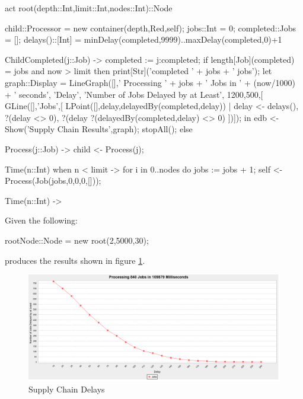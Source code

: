 \documentclass[5p,times]{elsarticle}
\begin{document}
\begin{ESL}
act root(depth::Int,limit::Int,nodes::Int)::Node {

  child::Processor = new container(depth,Red,self);
  jobs::Int = 0;
  completed::Jobs = [];
  delays()::[Int] = 
    minDelay(completed,9999)..maxDelay(completed,0)+1

  ChildCompleted(j::Job) -> {
    completed := j:completed;
    if length[Job](completed) = jobs and now > limit
    then {
      print[Str]('completed ' + jobs + ' jobs');
      let 
        graph::Display = 
          LineGraph([],'
                    Processing ' + jobs + ' Jobs in ' + 
                      (now/1000) + 
                      ' seconds',
                    'Delay',
                    'Number of Jobs Delayed by at Least',
                    1200,500,[
            GLine([],'Jobs',[
              LPoint([],delay,delayedBy(completed,delay)) | 
                delay <- delays(), 
                ?(delay <> 0), 
                ?(delay %
                ?(delayedBy(completed,delay) <> 0) ])]);
      in {
        edb <- Show('Supply Chain Results',graph);
        stopAll();
      }
    } else {}
  }

  Process(j::Job) -> child <- Process(j);

  Time(n::Int) when n < limit -> {
    for i in 0..nodes do {
      jobs := jobs + 1;
      self <- Process(Job(jobs,0,0,0,[]));
    }
  }

  Time(n::Int) -> {}
}
\end{ESL}
Given the following:
\begin{ESL}
rootNode::Node = new root(2,5000,30);
\end{ESL}
produces the results shown in figure \ref{fig:supply}.
\begin{figure}
\centering
\includegraphics[width=\textwidth]{supply_results}
\caption{Supply Chain Delays}
\label{fig:supply}
\end{figure}
\end{document}
